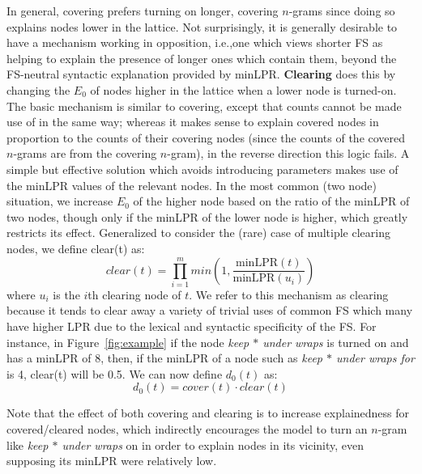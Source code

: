 \documentclass[11pt,letterpaper]{article}
\makeatletter
\def \ie {i.e.,\@ }
\newcommand{\gap}{$*$\xspace}
\newcommand{\ex}[1]{\textit{#1}\xspace}
\newcommand{\termdef}[1]{\textbf{#1}\xspace}
\newcommand{\minLPR}{\ensuremath{\text{minLPR}}}
\newcommand{\figref}[2][]{Figure#1~\ref{#2}\xspace}
\makeatother
\begin{document}
In general, covering prefers turning on longer, covering $n$-grams since doing so explains nodes lower in the lattice. Not surprisingly, it is generally desirable to have a mechanism working in opposition, \ie one which views shorter FS as helping to explain the presence of longer ones which contain them, beyond the FS-neutral syntactic explanation provided by minLPR. \termdef{Clearing} does this by changing the $E_0$ of nodes higher in the lattice when a lower node is turned-on. The basic mechanism is similar to covering, except that counts cannot be made use of in the same way; whereas it makes sense to explain covered nodes in proportion to the counts of their covering nodes (since the counts of the covered $n$-grams are from the covering $n$-gram), in the reverse direction this logic fails. A simple but effective solution which avoids introducing parameters makes use of the minLPR values of the relevant nodes. In the most common (two node) situation, we increase $E_{0}$ of the higher node based on the ratio of the minLPR of two nodes, though only if the minLPR of the lower node is higher, which greatly restricts its effect. Generalized to consider the (rare) case of multiple clearing nodes, we define clear(t) as:
\begin{displaymath}
clear(t) = \prod_{i=1}^{m}{ min(1,\frac{\minLPR(t)}{\minLPR(u_i)})}
\end{displaymath}
where $u_i$ is the $i$th clearing node of $t$. We refer to this mechanism as clearing because it tends to clear away a variety of trivial uses of common FS which many have higher LPR due to the lexical and syntactic specificity of the FS. For instance, in \figref{fig:example} if the node \ex{keep \gap under wraps}  is turned on and has a minLPR of 8, then, if the minLPR of a node such as \ex{keep \gap under wraps for} is 4, clear(t) will be 0.5. We can now define $d_{0}(t)$ as:
\begin{displaymath}
d_0(t) = cover(t) \cdot clear(t)
\end{displaymath}

Note that the effect of both covering and clearing is to  increase explainedness for covered/cleared nodes, which indirectly encourages the model to turn an $n$-gram like \ex{keep \gap under wraps} on in order to explain nodes in its vicinity, even supposing its minLPR were relatively low.
\end{document}
